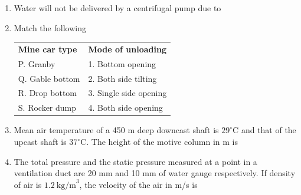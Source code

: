 \documentclass[journal]{IEEEtran}
\begin{document}
\begin{enumerate}
\item Water will not be delivered by a centrifugal pump due to
\begin{enumerate}
\end{enumerate}

\item Match the following

\medskip
\begin{tabular}{ll}
	\textbf{Mine car type} & \textbf{Mode of unloading} \\
P. Granby & 1. Bottom opening \\
Q. Gable bottom & 2. Both side tilting \\
R. Drop bottom & 3. Single side opening \\
S. Rocker dump & 4. Both side opening
\end{tabular}

\medskip
\begin{enumerate}
\end{enumerate}

\item Mean air temperature of a 450 m deep downcast shaft is $29^\circ$C and that of the upcast shaft is $37^\circ$C. The height of the motive column in m is
\begin{enumerate}
\end{enumerate}

\item The total pressure and the static pressure measured at a point in a ventilation duct are 20 mm and 10 mm of water gauge respectively. If density of air is $1.2\ \text{kg/m}^3$, the velocity of the air in m/s is
\begin{enumerate}
\end{enumerate}


\end{enumerate}
\end{document}
